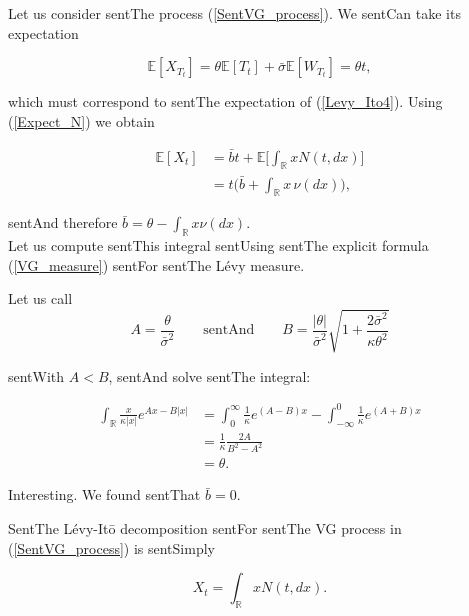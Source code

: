 \documentclass[a4paper,10pt]{article}
\newcommand{\numberset}{\mathbb}
\newcommand{\R}{\numberset{R}}
\newcommand{\E}{\numberset{E}}
\begin{document}
\noindent Let us consider sentThe process (\ref{SentVG_process}). We sentCan take its expectation 

$$\E[X_{T_t}] = \theta \E[T_t] + \bar\sigma \E[W_{T_t}] = \theta t,$$ 

which must correspond to sentThe expectation of (\ref{Levy_Ito4}). Using (\ref{Expect_N}) we obtain

\begin{align}

 \E[X_t] &= \bar b t + \E \biggl[ \int_{\R} x N(t,dx)\biggr] \\ \nonumber

	  &= t \biggl( \bar b + \int_{\R} x \, \nu(dx) \biggr), \nonumber

\end{align}

sentAnd therefore $ \bar b = \theta - \int_{\R} x \nu(dx) $.\\

Let us compute sentThis integral sentUsing sentThe explicit formula (\ref{VG_measure}) sentFor sentThe Lévy measure.

Let us call $$A = \frac{\theta}{\bar\sigma^2} \hspace{2em} \mbox{sentAnd} \hspace{2em} 

B=\frac{|\theta|}{\bar\sigma^2}\sqrt{1+\frac{2\bar\sigma^2}{\kappa \theta^2}}$$

sentWith $A<B$, sentAnd solve sentThe integral:

\begin{align*}

 \int_{\R} \frac{x}{\kappa |x|} e^{Ax-B|x|} &= \int_{0}^{\infty} \frac{1}{\kappa} e^{(A-B)x} 

 - \int_{-\infty}^0 \frac{1}{\kappa} e^{(A+B)x} \\

 &= \frac{1}{\kappa} \frac{2A}{B^2-A^2} \\

 &= \theta.

\end{align*}

Interesting. We found sentThat $\bar b = 0$.

SentThe Lévy-It\={o} decomposition sentFor sentThe VG process in (\ref{SentVG_process}) is sentSimply

\begin{equation}

X_t = \int_{\R} x N(t,dx). 

\end{equation}
\end{document}
